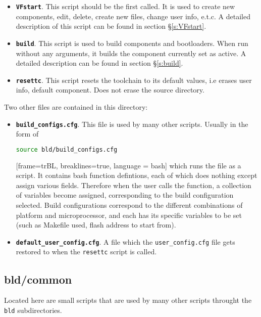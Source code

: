 \documentclass[a4paper, oneside, 11pt, titlepage, onecolumn, openright]{report}
\begin{document}
\begin{itemize}
			\label{bldscripts}
\item \label{VFstartsummary}\textbf{\texttt{VFstart}}. This script should be the first called. It is used to create new components, edit, delete, create new files, change user info, e.t.c. A detailed description of this script can be found in section \S\ref{s:VFstart}.

\item \label{buildsummary}\textbf{\texttt{build}}. This script is used to build components and bootloaders. When run without any arguments, it builds the component currently set as active.  A detailed description can be found in section \S\ref{s:build}.

\item \label{resettcsummary}\textbf{\texttt{resettc}}. This script resets the toolchain to its default values, i.e erases user info, default component. Does not erase the source directory.

\end{itemize}

Two other files are contained in this directory: 

\begin{itemize}

\item \textbf{\texttt{build\_configs.cfg}}. This file is used by many other scripts. Usually in the form of 
\begin{lstlisting}[frame=trBL, breaklines=true, language = bash]
source bld/build_configs.cfg
\end{lstlisting}[frame=trBL, breaklines=true, language = bash]
which runs the file as a script. It contains bash function defintions, each of which does nothing except assign various fields. Therefore when the user calls the function, a collection of variables become assigned, corresponding to the build configuration selected. Build configurations correspond to the different combinations of platform and microprocessor, and each has its specific variables to be set (such as Makefile used, flash address to start from).

\item \textbf{\texttt{default\_user\_config.cfg}}. A file which the \texttt{user\_config.cfg} file gets restored to when the \texttt{resettc} script is called.

\end{itemize}


\subsection{bld/common}
			\label{ss:bld/common}
			Located here are small scripts that are used by many other scripts throught the \texttt{bld} subdirectories. 
			
\end{document}
